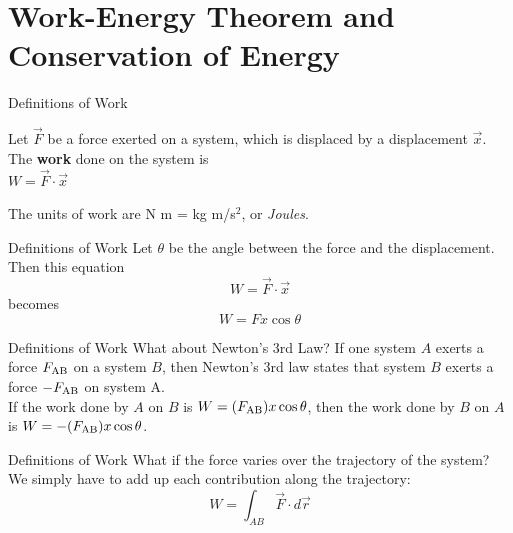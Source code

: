 \documentclass{beamer}
\begin{document}
\section{Work-Energy Theorem and Conservation of Energy}

\begin{frame}{Definitions of Work}
\begin{tcolorbox}[colback=white,colframe=red!40!blue,title=Physical Definition of Work]
\alert{Let $\vec{F}$ be a force exerted on a system, which is displaced by a displacement $\vec{x}$.  The \textbf{work} done on the system is} \\
\alert{$W = \vec{F} \cdot \vec{x}$} \\
\end{tcolorbox}
The units of work are N m = kg m/s$^2$, or \textit{Joules}. \\
\end{frame}

\begin{frame}{Definitions of Work}
Let $\theta$ be the angle between the force and the displacement.  Then this equation
\begin{equation}
W = \vec{F} \cdot \vec{x}
\end{equation}
becomes
\begin{equation}
W = Fx\cos\theta
\end{equation}
\end{frame}

\begin{frame}{Definitions of Work}
What about Newton's 3rd Law?  If one system $A$ exerts a force $F_{\rm AB}$ on a system $B$, then Newton's 3rd law states that system $B$ exerts a force $-F_{\rm AB}$ on system A. \\
\vspace{0.5cm}
If \alert{the work done by $A$ on $B$} is $W = (F_{\rm AB})x\cos\theta$, then \alert{the work done by $B$ on $A$} is $W = -(F_{\rm AB})x\cos\theta$.
\end{frame}

\begin{frame}{Definitions of Work}
What if the force varies over the trajectory of the system?  We simply have to add up each contribution along the trajectory:
\begin{equation}
W = \int_{AB} \vec{F} \cdot d\vec{r}
\end{equation}
\end{frame}
\end{document}

